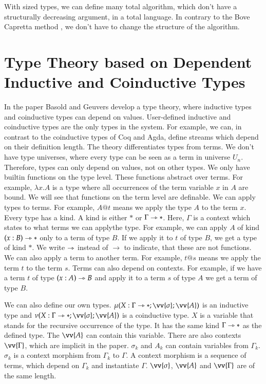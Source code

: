 \documentclass[a4paper,cleardoubleempty,BCOR1cm]{scrbook}
\begin{document}
With sized types, we can define many total algorithm, which don't have a
structurally decreasing argument, in a total language. In contrary to the
Bove Capretta method \cite{bove2005modelling}, we don't have to change the structure of the
algorithm.

\chapter{Type Theory based on Dependent Inductive and Coinductive Types}
\label{sec:org25524b6}
In the paper \cite{basold2016type} Basold and Geuvers develop a type theory,
where inductive types and coinductive types can depend on values. User-defined
inductive and coinductive types are the only types in the system. For example,
we can, in contrast to the coinductive types of Coq and Agda, define streams
which depend on their definition length. The theory differentiates types from
terms. We don't have type universes, where every type can be seen as a term in
universe \(U_n\). Therefore, types can only depend on values, not on other
types. We only have builtin functions on the type level. These functions
abstract over terms. For example, \(\lambda x.A\) is a type where all
occurrences of the term variable \(x\) in \(A\) are bound. We will see that
functions on the term level are definable. We can apply types to terms. For
example, \(A @ t\) means we apply the type \(A\) to the term \(x\). Every type has a kind. A
kind is either \(*\) or \(\Gamma\rightarrowtriangle*\). Here, \(\Gamma\) is a context which states
to what terms we can applythe type. For example, we can apply \(A\) of kind
\((x:B)\rightarrowtriangle*\) only to a term of type \(B\). If we apply it to \(t\) of type \(B\), we
get a type of kind \(*\). We write \(\rightarrowtriangle\) instead of \(\rightarrow\) to indicate,
that these are not functions. We can also apply a term to another term. For
example, \(t@s\) means we apply the term \(t\) to the term \(s\). Terms can also
depend on contexts. For example, if we have a term \(t\) of type \((x:A)\rightarrowtriangle B\)
and apply it to a term \(s\) of type \(A\) we get a term of type \(B\).

We can also define our own types. \(\mu(X:\Gamma\rat*;\vv{\sigma};\vv{A})\) is
an inductive type and \(\nu(X:\Gamma\rat*;\vv{\sigma};\vv{A})\) is a coinductive
type. \(X\) is a variable that stands for the recursive occurrence of the type.
It has the same kind \(\Gamma\rightarrowtriangle*\) as the defined type. The \(\vv{A}\) can
contain this variable. There are also contexts \(\vv{\Gamma}\), which are
implicit in the paper. \(\sigma_k\) and \(A_k\) can contain variables from
\(\Gamma_k\). \(\sigma_k\) is a context morphism from \(\Gamma_k\) to \(\Gamma\). A
context morphism is a sequence of terms, which depend on \(\Gamma_k\) and
instantiate \(\Gamma\). \(\vv{\sigma}\), \(\vv{A}\) and \(\vv{\Gamma}\) are of the
same length.
\end{document}
